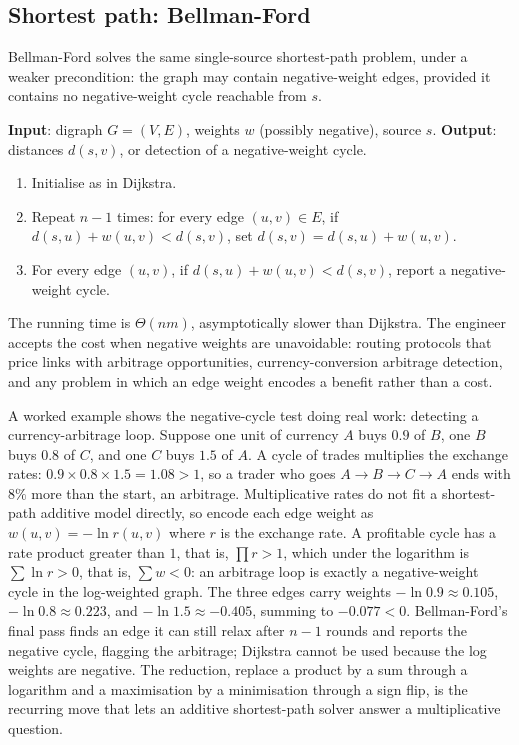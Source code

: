 

\subsection{Shortest path: Bellman-Ford}

Bellman-Ford solves the same single-source shortest-path problem,
under a weaker precondition: the graph may contain negative-weight
edges, provided it contains no negative-weight cycle reachable from
$s$.

\begin{principle}
\textbf{Input}: digraph $G = (V, E)$, weights $w$ (possibly
negative), source $s$.
\textbf{Output}: distances $d(s, v)$, or detection of a
negative-weight cycle.

\begin{enumerate}[leftmargin=*]
  \item Initialise as in Dijkstra.
  \item Repeat $n - 1$ times: for every edge $(u, v) \in E$, if
    $d(s, u) + w(u, v) < d(s, v)$, set $d(s, v) = d(s, u) + w(u, v)$.
  \item For every edge $(u, v)$, if $d(s, u) + w(u, v) < d(s, v)$,
    report a negative-weight cycle.
\end{enumerate}
\end{principle}

The running time is $\Theta(nm)$, asymptotically slower than
Dijkstra. The engineer accepts the cost when negative weights are
unavoidable: routing protocols that price links with arbitrage
opportunities, currency-conversion arbitrage detection, and any
problem in which an edge weight encodes a benefit rather than a
cost.

A worked example shows the negative-cycle test doing real work:
detecting a currency-arbitrage loop. Suppose one unit of currency
$A$ buys $0.9$ of $B$, one $B$ buys $0.8$ of $C$, and one $C$ buys
$1.5$ of $A$. A cycle of trades multiplies the exchange rates:
$0.9 \times 0.8 \times 1.5 = 1.08 > 1$, so a trader who goes
$A \to B \to C \to A$ ends with $8\%$ more than the start, an
arbitrage. Multiplicative rates do not fit a shortest-path additive
model directly, so encode each edge weight as $w(u, v) = -\ln r(u,
v)$ where $r$ is the exchange rate. A profitable cycle has a rate
product greater than $1$, that is, $\prod r > 1$, which under the
logarithm is $\sum \ln r > 0$, that is, $\sum w < 0$: an arbitrage
loop is exactly a negative-weight cycle in the log-weighted graph.
The three edges carry weights $-\ln 0.9 \approx 0.105$, $-\ln 0.8
\approx 0.223$, and $-\ln 1.5 \approx -0.405$, summing to $-0.077 <
0$. Bellman-Ford's final pass finds an edge it can still relax after
$n - 1$ rounds and reports the negative cycle, flagging the
arbitrage; Dijkstra cannot be used because the log weights are
negative. The reduction, replace a product by a sum through a
logarithm and a maximisation by a minimisation through a sign flip,
is the recurring move that lets an additive shortest-path solver
answer a multiplicative question.

